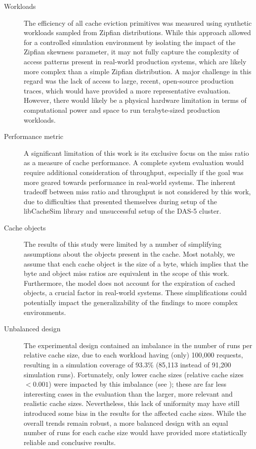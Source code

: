 \begin{description}
    \item[Workloads] The efficiency of all cache eviction primitives was measured using synthetic workloads sampled from Zipfian distributions. While this approach allowed for a controlled simulation environment by isolating the impact of the Zipfian skewness parameter, it may not fully capture the complexity of access patterns present in real-world production systems, which are likely more complex than a simple Zipfian distribution. A major challenge in this regard was the lack of access to large, recent, open-source production traces, which would have provided a more representative evaluation. However, there would likely be a physical hardware limitation in terms of computational power and space to run terabyte-sized production workloads.    
    
    \item[Performance metric] A significant limitation of this work is its exclusive focus on the miss ratio as a measure of cache performance. A complete system evaluation would require additional consideration of throughput, especially if the goal was more geared towards performance in real-world systems. The inherent tradeoff between miss ratio and throughput is not considered by this work, due to difficulties that presented themselves during setup of the libCacheSim library and unsuccessful setup of the DAS-5 cluster.
    
    \item[Cache objects] The results of this study were limited by a number of simplifying assumptions about the objects present in the cache. Most notably, we assume that each cache object is the size of a byte, which implies that the byte and object miss ratios are equivalent in the scope of this work. Furthermore, the model does not account for the expiration of cached objects, a crucial factor in real-world systems. These simplifications could potentially impact the generalizability of the findings to more complex environments.
    
    \item[Unbalanced design] The experimental design contained an imbalance in the number of runs per relative cache size, due to each workload having (only) 100,000 requests, resulting in a simulation coverage of 93.3\% (85,113 instead of 91,200 simulation runs). Fortunately, only lower cache sizes (relative cache sizes $< 0.001$) were impacted by this imbalance (see ); these are far less interesting cases in the evaluation than the larger, more relevant and realistic cache sizes. Nevertheless, this lack of uniformity may have still introduced some bias in the results for the affected cache sizes. While the overall trends remain robust, a more balanced design with an equal number of runs for each cache size would have provided more statistically reliable and conclusive results.
\end{description}



